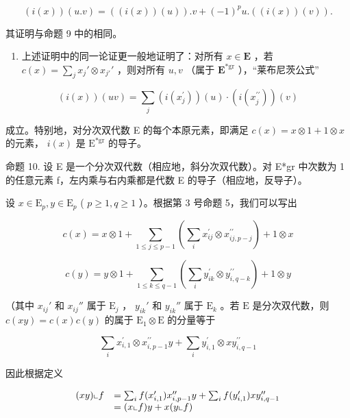\[
(i (x)) (u. v) = ((i (x)) (u)). v + (- 1) ^ {p} u. ((i (x)) (v)).
\]

其证明与命题 9 中的相同。

\begin{enumerate}
\def\labelenumi{(\arabic{enumi})}
\setcounter{enumi}{1}
\tightlist
\item
  上述证明中的同一论证更一般地证明了：对所有 \(x \in \mathbf{E}\) ，若 \(c(x) = \sum_{j} x_j' \otimes x_{j'}'\) ，则对所有 \(u, v\) （属于 \(\mathbf{E}^{*\mathrm{gr}}\) ），“莱布尼茨公式”
\end{enumerate}

\[
(i (x)) (u v) = \sum_ {j} (i (x _ {j} ^ {\prime})) (u) \cdot (i (x _ {j} ^ {\prime \prime})) (v)
\]

成立。特别地，对分次双代数 E 的每个本原元素，即满足 \(c(x) = x \otimes 1 + 1 \otimes x\) 的元素， \(i(x)\) 是 \(\mathrm{E}^{*\mathrm{gr}}\) 的导子。

命题 10. 设 E 是一个分次双代数（相应地，斜分次双代数）。对 E*gr 中次数为 1 的任意元素 f，左内乘与右内乘都是代数 E 的导子（相应地，反导子）。

设 \(x \in \mathrm{E}_p, y \in \mathrm{E}_p\) ( \(p \geqslant 1, q \geqslant 1\) ）。根据第 3 号命题 5，我们可以写出

\[
c (x) = x \otimes 1 + \sum_ {1 \leqslant j \leqslant p - 1} \left(\sum_ {i} x _ {i j} ^ {\prime} \otimes x _ {i j, p - j} ^ {\prime \prime}\right) + 1 \otimes x
\]

\[
c (y) = y \otimes 1 + \sum_ {1 \leqslant k \leqslant q - 1} \left(\sum_ {i} y _ {i k} ^ {\prime} \otimes y _ {i, q - k} ^ {\prime \prime}\right) + 1 \otimes y
\]

（其中 \(x_{ij}'\) 和 \(x_{ij}''\) 属于 \(\mathrm{E}_j\) ， \(y_{ik}'\) 和 \(y_{ik}''\) 属于 \(\mathrm{E}_k\) 。若 \(\mathrm{E}\) 是分次双代数，则 \(c(xy) = c(x)c(y)\) 的属于 \(\mathrm{E}_1 \otimes \mathrm{E}\) 的分量等于

\[
\sum_ {i} x _ {i, 1} ^ {\prime} \otimes x _ {i, p - 1} ^ {\prime \prime} y + \sum_ {i} y _ {i, 1} ^ {\prime} \otimes x y _ {i, q - 1} ^ {\prime \prime}
\]

因此根据定义

\[
\begin{array}{r l} (x y) \llcorner f & = \sum_ {i} f (x _ {i, 1} ^ {\prime}) x _ {i, p - 1} ^ {\prime \prime} y + \sum_ {i} f (y _ {i, 1} ^ {\prime}) x y _ {i, q - 1} ^ {\prime \prime} \\ & = (x \llcorner f) y + x (y \llcorner f) \end{array}
\]

